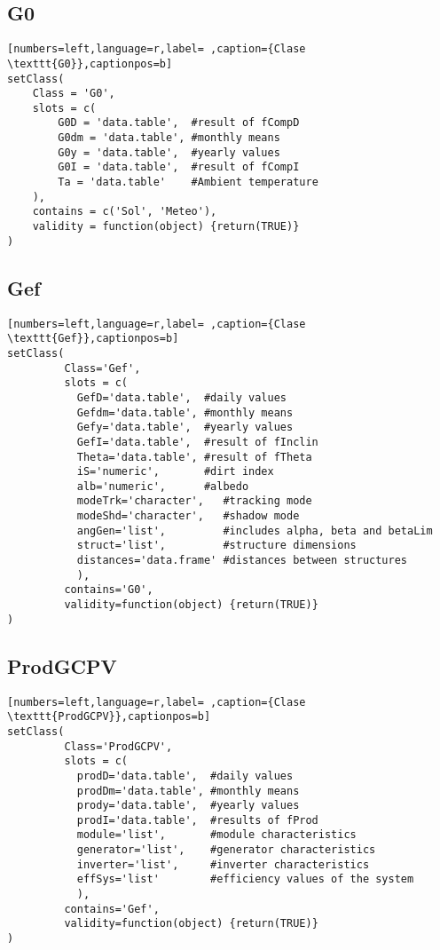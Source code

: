 \subsection{G0}
\label{sec:orgf2d80b3}
\label{subsec:g0}
\begin{lstlisting}[numbers=left,language=r,label= ,caption={Clase \texttt{G0}},captionpos=b]
setClass(
    Class = 'G0',
    slots = c(
        G0D = 'data.table',  #result of fCompD
        G0dm = 'data.table', #monthly means
        G0y = 'data.table',  #yearly values
        G0I = 'data.table',  #result of fCompI
        Ta = 'data.table'    #Ambient temperature
    ),
    contains = c('Sol', 'Meteo'),
    validity = function(object) {return(TRUE)}
)

\end{lstlisting}
\subsection{Gef}
\label{sec:orgaeadc4d}
\label{subsec:gef}
\begin{lstlisting}[numbers=left,language=r,label= ,caption={Clase \texttt{Gef}},captionpos=b]
setClass(
         Class='Gef',
         slots = c(
           GefD='data.table',  #daily values
           Gefdm='data.table', #monthly means
           Gefy='data.table',  #yearly values
           GefI='data.table',  #result of fInclin
           Theta='data.table', #result of fTheta
           iS='numeric',       #dirt index
           alb='numeric',      #albedo
           modeTrk='character',   #tracking mode
           modeShd='character',   #shadow mode
           angGen='list',         #includes alpha, beta and betaLim
           struct='list',         #structure dimensions
           distances='data.frame' #distances between structures
           ),
         contains='G0',
         validity=function(object) {return(TRUE)}
)
\end{lstlisting}
\subsection{ProdGCPV}
\label{sec:org617e956}
\label{subsec:clase-prodgcpv}
\begin{lstlisting}[numbers=left,language=r,label= ,caption={Clase \texttt{ProdGCPV}},captionpos=b]
setClass(
         Class='ProdGCPV',
         slots = c(
           prodD='data.table',  #daily values
           prodDm='data.table', #monthly means
           prody='data.table',  #yearly values
           prodI='data.table',  #results of fProd
           module='list',       #module characteristics
           generator='list',    #generator characteristics
           inverter='list',     #inverter characteristics
           effSys='list'        #efficiency values of the system
           ),
         contains='Gef',
         validity=function(object) {return(TRUE)}
)
\end{lstlisting}
